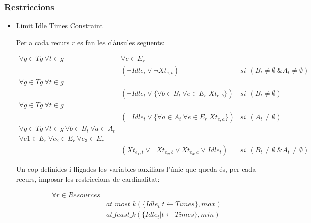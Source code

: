 \documentclass[8pt]{beamer}
\begin{document}
  \begin{frame}
    \frametitle{Restriccions}

    \begin{itemize}
      \item Limit Idle Times Constraint

      Per a cada recurs $r$ es fan les clàusules següents:

       \begin{align*}
        \forall g \in Tg \ \forall t \in g \ &\forall e \in E_r \\
        &(\neg Idle_i \lor \neg Xt_{e, t}) & si \ \ (B_t \neq \emptyset \ \& A_t \neq \emptyset) \\
        \forall g \in Tg \ \forall t \in g  \ & \\
        & (\neg Idle_t \lor \{\forall b \in B_t \ \forall e \in E_r \ Xt_{e,b}\}) & si \ \ (B_t \neq \emptyset)\\
        \forall g \in Tg \ \forall t \in g & \\
        & (\neg Idle_t \lor \{\forall a \in A_t \ \forall e \in E_r \ Xt_{e,a}\}) & si \ \ (A_t \neq \emptyset)\\
        \forall g \in Tg \ \forall t \in g \ \forall b \in B_t \ \forall a \in A_t & \\
        \forall e1 \in E_r \ \forall e_2 \in E_r \ \forall e_3 \in E_r & \\
        & (Xt_{e_{1}, t} \lor \neg Xt_{e_2, b} \lor Xt_{e_3, a} \lor Idle_t) & si \ \ (B_t \neq \emptyset \ \& A_t \neq \emptyset)
       \end{align*}
    
       Un cop definides i lligades les variables auxiliars l'únic que queda és, per cada recurs, imposar les restriccions de cardinalitat:
    
       \begin{align*}
        \forall r \in Resources &\\
        & at\_most\_k(\{ Idle_t | t \leftarrow Times\}, max) \\
        & at\_least\_k(\{ Idle_t | t \leftarrow Times\}, min)
       \end{align*}
    \end{itemize}
  
  \end{frame}
\end{document}
